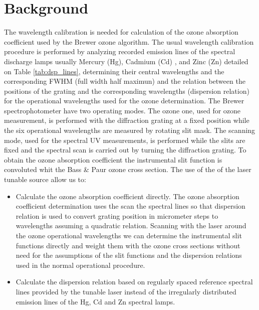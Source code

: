 \documentclass[acp]{copernicus} %
\begin{document}

\section{Background}

The wavelength calibration is needed for calculation of the ozone absorption coefficient used by the Brewer ozone algorithm. The usual wavelength calibration procedure is performed by analyzing recorded emission lines of the spectral discharge lamps  usually Mercury (Hg), Cadmium (Cd) , and Zinc (Zn) detailed on Table \ref{tab:dsp_lines}, determining their central wavelengths and the corresponding FWHM (full width half maximun)   and the relation between the positions of the grating  and the  corresponding wavelengths  (dispersion relation) for the operational wavelengths used for the ozone determination. The Brewer spectrophotometer have two operating  modes. The ozone one, used for ozone measurement, is performed with the diffraction grating at a fixed position while  the six operational wavelengths are measured by  rotating slit mask.  The scanning mode, used for the spectral UV measurements, is performed while the slits are fixed and the spectral scan is carried out by turning the diffraction grating. To obtain the ozone absorption coefficient the instrumental slit function is convoluted whit the Bass \& Paur ozone cross section.
The use of the of the laser tunable source allow us to:
\begin{itemize}

    \item Calculate the ozone absorption coefficient directly.  The ozone absorption coefficient  determination  uses the scan the spectral lines so that dispersion relation is used to convert grating position in micrometer steps to wavelengths assuming a quadratic relation. Scanning with the laser around the ozone operational wavelengths we can determine the instrumental slit functions directly and weight them with the ozone cross sections without need for the assumptions of the slit functions and the dispersion relations used in the normal operational procedure.
    \item Calculate the dispersion relation based on regularly spaced reference spectral lines provided by the tunable laser instead of the irregularly distributed  emission lines of the  Hg, Cd and Zn spectral lamps. 
\end{itemize}

\end{document}
